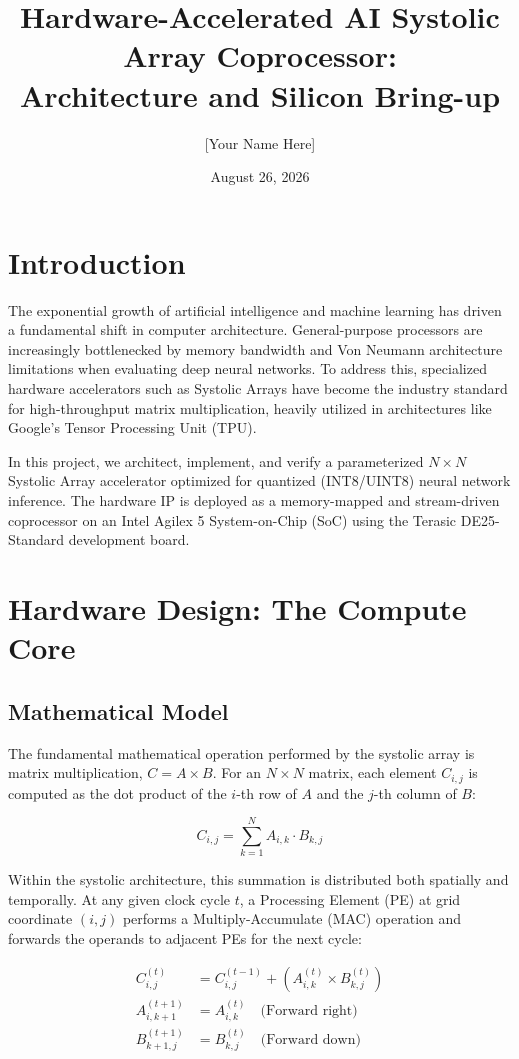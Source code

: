 \documentclass[12pt, letterpaper]{article}
\title{Hardware-Accelerated AI Systolic Array Coprocessor:\\Architecture and Silicon Bring-up}
\author{[Your Name Here]}
\date{August 26, 2026}
\begin{document}
\maketitle

\section*{Introduction}
The exponential growth of artificial intelligence and machine learning has driven a fundamental shift in computer architecture. General-purpose processors are increasingly bottlenecked by memory bandwidth and Von Neumann architecture limitations when evaluating deep neural networks. To address this, specialized hardware accelerators such as Systolic Arrays have become the industry standard for high-throughput matrix multiplication, heavily utilized in architectures like Google's Tensor Processing Unit (TPU).

In this project, we architect, implement, and verify a parameterized $N \times N$ Systolic Array accelerator optimized for quantized (INT8/UINT8) neural network inference. The hardware IP is deployed as a memory-mapped and stream-driven coprocessor on an Intel Agilex 5 System-on-Chip (SoC) using the Terasic DE25-Standard development board.

\section{Hardware Design: The Compute Core}

\subsection{Mathematical Model}
The fundamental mathematical operation performed by the systolic array is matrix multiplication, $C = A \times B$. For an $N \times N$ matrix, each element $C_{i,j}$ is computed as the dot product of the $i$-th row of $A$ and the $j$-th column of $B$:

\begin{equation}
C_{i,j} = \sum_{k=1}^{N} A_{i,k} \cdot B_{k,j}
\end{equation}

Within the systolic architecture, this summation is distributed both spatially and temporally. At any given clock cycle $t$, a Processing Element (PE) at grid coordinate $(i,j)$ performs a Multiply-Accumulate (MAC) operation and forwards the operands to adjacent PEs for the next cycle:

\begin{align}
C_{i,j}^{(t)} &= C_{i,j}^{(t-1)} + \left( A_{i,k}^{(t)} \times B_{k,j}^{(t)} \right) \\
A_{i, k+1}^{(t+1)} &= A_{i,k}^{(t)} \quad \text{(Forward right)} \\
B_{k+1, j}^{(t+1)} &= B_{k,j}^{(t)} \quad \text{(Forward down)}
\end{align}
\end{document}
